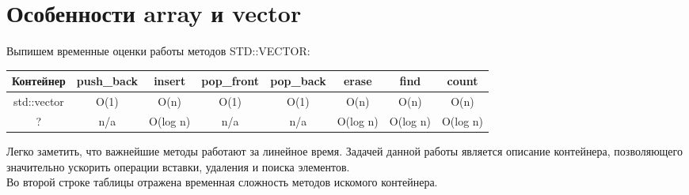 \documentclass{article}
\begin{document}
\begin{titlepage}

\end{titlepage}

\section{Особенности array и vector}
Выпишем временные оценки работы методов STD::VECTOR:

\begin{center}
    \begin{tabular}{| c || c | c | c | c | c | c | c |}
        \hline
        Контейнер & push\_back & insert & pop\_front & pop\_back & erase & find & count\\ 
        \hline
        std::vector & O(1) & O(n) & O(1) & O(1) & O(n) & O(n) & O(n) \\ 
        \hline
        ? & n/a & O(log n) & n/a & n/a & O(log n) & O(log n) & O(log n) \\
        \hline
    \end{tabular}
\end{center}
Легко заметить, что важнейшие методы работают за линейное время. Задачей данной работы является описание контейнера, позволяющего значительно ускорить операции вставки, удаления и поиска элементов.\\
Во второй строке таблицы отражена временная сложность методов искомого контейнера. \\
\vspace{5mm}
\end{document}
